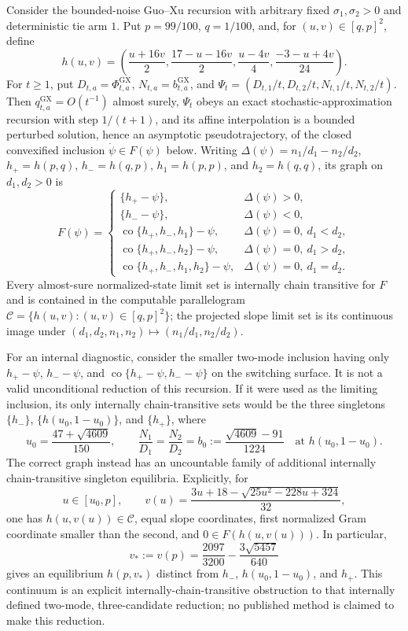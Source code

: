 Consider the bounded-noise Guo--Xu recursion with arbitrary fixed \(\sigma_1,\sigma_2>0\) and deterministic tie arm \(1\). Put \(p=99/100\), \(q=1/100\), and, for \((u,v)\in[q,p]^2\), define
\[
 h(u,v)=\left(\frac{u+16v}{2},\frac{17-u-16v}{2},
                 \frac{u-4v}{4},\frac{-3-u+4v}{24}\right).
\]
For \(t\ge1\), put \(D_{t,a}=\Phi^{\mathrm{GX}}_{t,a}\), \(N_{t,a}=b^{\mathrm{GX}}_{t,a}\), and \(\Psi_t=(D_{t,1}/t,D_{t,2}/t,N_{t,1}/t,N_{t,2}/t)\). Then \(q^{\mathrm{GX}}_{t,a}=O(t^{-1})\) almost surely, \(\Psi_t\) obeys an exact stochastic-approximation recursion with step \(1/(t+1)\), and its affine interpolation is a bounded perturbed solution, hence an asymptotic pseudotrajectory, of the closed convexified inclusion \(\dot\psi\in F(\psi)\) below. Writing \(\Delta(\psi)=n_1/d_1-n_2/d_2\), \(h_+=h(p,q)\), \(h_-=h(q,p)\), \(h_1=h(p,p)\), and \(h_2=h(q,q)\), its graph on \(d_1,d_2>0\) is
\[
 F(\psi)=
 \begin{cases}
  \{h_+-\psi\},&\Delta(\psi)>0,\\
  \{h_--\psi\},&\Delta(\psi)<0,\\
  \operatorname{co}\{h_+,h_-,h_1\}-\psi,&\Delta(\psi)=0,\ d_1<d_2,\\
  \operatorname{co}\{h_+,h_-,h_2\}-\psi,&\Delta(\psi)=0,\ d_1>d_2,\\
  \operatorname{co}\{h_+,h_-,h_1,h_2\}-\psi,&\Delta(\psi)=0,\ d_1=d_2.
 \end{cases}
\]
Every almost-sure normalized-state limit set is internally chain transitive for \(F\) and is contained in the computable parallelogram \(\mathcal C=\{h(u,v):(u,v)\in[q,p]^2\}\); the projected slope limit set is its continuous image under \((d_1,d_2,n_1,n_2)\mapsto(n_1/d_1,n_2/d_2)\).

For an internal diagnostic, consider the smaller two-mode inclusion having only \(h_+-\psi\), \(h_--\psi\), and \(\operatorname{co}\{h_+-\psi,h_--\psi\}\) on the switching surface. It is not a valid unconditional reduction of this recursion. If it were used as the limiting inclusion, its only internally chain-transitive sets would be the three singletons \(\{h_-\}\), \(\{h(u_0,1-u_0)\}\), and \(\{h_+\}\), where
\[
 u_0=\frac{47+\sqrt{4609}}{150},\qquad
 \frac{N_1}{D_1}=\frac{N_2}{D_2}
 =b_0:=\frac{\sqrt{4609}-91}{1224}
 \quad\text{at }h(u_0,1-u_0).
\]
The correct graph instead has an uncountable family of additional internally chain-transitive singleton equilibria. Explicitly, for
\[
 u\in[u_0,p],\qquad
 v(u)=\frac{3u+18-\sqrt{25u^2-228u+324}}{32},
\]
one has \(h(u,v(u))\in\mathcal C\), equal slope coordinates, first normalized Gram coordinate smaller than the second, and \(0\in F(h(u,v(u)))\). In particular,
\[
 v_*:=v(p)=\frac{2097}{3200}-\frac{3\sqrt{5457}}{640}
\]
gives an equilibrium \(h(p,v_*)\) distinct from \(h_-\), \(h(u_0,1-u_0)\), and \(h_+\). This continuum is an explicit internally-chain-transitive obstruction to that internally defined two-mode, three-candidate reduction; no published method is claimed to make this reduction.

